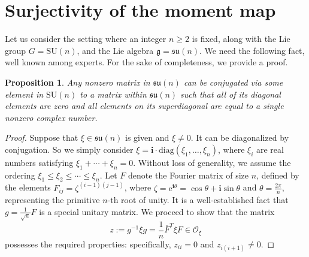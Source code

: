 \documentclass[12pt]{amsart}
\newtheorem{proposition}[theorem]{Proposition}
\theoremstyle{definition}
\numberwithin{equation}{section}
\def\diag{\mathrm{diag}}
\newcommand{\imagunit}{\mathbf{i}}
\newcommand{\SU}{\mathrm{SU}}
\newcommand{\su}{\mathfrak{su}}
\newcommand{\rme}{\mathrm{e}}
\newcommand{\Oxi}{\mathcal{O}_{\xi}}
\newcommand{\galgebra}{\mathfrak{g}}
\begin{document}
{\section{Surjectivity of the moment   map}\label{Sec:JTstarGsurjectiveSUn}


Let us consider the setting where an integer \( n \geqslant 2 \) is fixed, along with the Lie group \( G = \SU(n) \), and the Lie algebra \( \galgebra = \su(n) \).  
We need the following fact,  well known   among experts. 
For the sake of completeness, we provide a proof.  \begin{proposition}\label{Prop:anyxitoO0} Any nonzero matrix in $\su(n)$ can be conjugated via some element in $\SU(n)$ to a matrix within $\su(n)$ such that all of its diagonal elements are zero and all elements on its   superdiagonal are equal to a single nonzero complex number. \end{proposition}
\begin{proof}Suppose that $\xi\in \su(n)$ is given and $\xi\neq 0$. It can be diagonalized by conjugation. So we simply consider  \(\xi = \imagunit \cdot \diag(\xi_1, \ldots, \xi_n)\), where \(\xi_i\) are real numbers satisfying \(\xi_1 + \cdots + \xi_n = 0\).   	
	Without loss of generality, we assume the ordering \(\xi_1 \leqslant \xi_2 \leqslant \cdots \leqslant \xi_n\). Let \( F \) denote the Fourier matrix of size \( n \), defined by the elements \( F_{ij} = \zeta^{(i-1)(j-1)} \), where \(\zeta = \rme^{\imagunit \theta} = \cos \theta + \imagunit \sin \theta\) and \(\theta = \frac{2\pi}{n}\), representing the primitive \( n \)-th root of unity. It is a well-established fact that \( g = \frac{1}{\sqrt{n}} F \) is a special unitary matrix. We proceed to show that the matrix \[ z := g^{-1} \xi g = \frac{1}{n} \overline{F}^T \xi F \in \Oxi \] possesses the required properties: specifically, \( z_{ii} = 0 \) and \( z_{i(i+1)} \neq 0 \).
	

\end{proof}}
\end{document}
